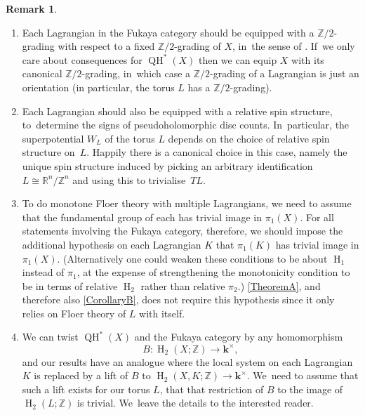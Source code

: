 \documentclass[JEP,XML,SOM,Unicode,NoEqCountersInSection,NoFloatCountersInSection,published]{cedram}
\theoremstyle{definition}
\newtheorem{remark}[theorem]{Remark}
\newcommand{\RR}{\mathbb{R}}
\newcommand{\ZZ}{\mathbb{Z}}
\newcommand{\kk}{{\boldsymbol{k}}}
\newcommand{\rH}{\operatorname{H}}
\newcommand{\QH}{\operatorname{QH}}
\begin{document}
\skpt
\begin{remark}
\label{rmkFukTechnical}
\begin{enumerate}
\item Each Lagrangian in the Fukaya category should be equipped with a $\ZZ/2$-grading with respect to a fixed $\ZZ/2$-grading of $X$, in~the sense of \cite{SeidelGraded}. If~we only care about consequences for $\QH^*(X)$ then we can equip $X$ with its canonical $\ZZ/2$-grading, in~which case a $\ZZ/2$-grading of a Lagrangian is just an orientation (in particular, the torus $L$ has a $\ZZ/2$-grading).
\item Each Lagrangian should also be equipped with a relative spin structure, to~determine the signs of pseudoholomorphic disc counts. In~particular, the superpotential $W_L$ of the torus $L$ depends on the choice of relative spin structure on~$L$. Happily there is a canonical choice in this case, namely the unique spin structure induced by picking an arbitrary identification $L \!\cong\! \RR^n / \ZZ^n$ and using this to trivialise~$TL$.
\item To do monotone Floer theory with multiple Lagrangians, we need to assume that the fundamental group of each has trivial image in $\pi_1(X)$. For all statements involving the Fukaya category, therefore, we should impose the additional hypothesis on each Lagrangian $K$ that $\pi_1(K)$ has trivial image in $\pi_1(X)$. (Alternatively one could weaken these conditions to be about $\rH_1$ instead of $\pi_1$, at the expense of strengthening the monotonicity condition to be in terms of relative $\rH_2$ rather than relative $\pi_2$.) \cref{TheoremA}, and therefore also \cref{CorollaryB}, does not require this hypothesis since it only relies on Floer theory of $L$ with itself.
\item We can twist $\QH^*(X)$ and the Fukaya category by any homomorphism
\[
B : \rH_2(X; \ZZ) \to \kk^\times,
\]
and our results have an analogue where the local system on each Lagrangian $K$ is replaced by a lift of $B$ to $\rH_2(X, K; \ZZ) \to \kk^\times$. We~need to assume that such a lift exists for our torus $L$, \ie that that restriction of $B$ to the image of $\rH_2(L; \ZZ)$ is trivial. We~leave the details to the interested reader.
\end{enumerate}
\end{remark}
\end{document}
